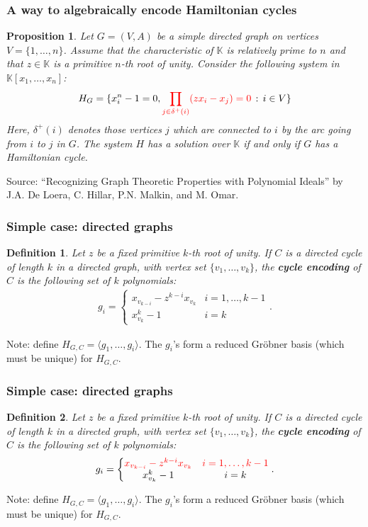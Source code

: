\documentclass{beamer}
\newtheorem*{prop}{Proposition}
\newtheorem*{defin}{Definition}
\begin{document}
\begin{frame}
\frametitle{A way to algebraically encode Hamiltonian cycles}
\begin{prop}
  Let $G = (V,A)$ be a simple directed graph on vertices $V = \{1, \ldots, n\}$. Assume that the characteristic of $\mathbb{K}$ is relatively prime to $n$ and that $z \in \mathbb{K}$ is a primitive $n$-th root of unity. Consider the following system in $\mathbb{K}[x_1, \ldots, x_n]$:
  \begin{align*}
    H_G = \{x_i^n - 1 = 0, {\color{red} \prod_{j \in \delta^+(i)} (z x_i - x_j) = 0} \, : \, i \in V\}
  \end{align*}
  Here, $\delta^+(i)$ denotes those vertices $j$ which are connected to $i$ by the arc going from $i$ to $j$ in $G$. The system $H$ has a solution over $\mathbb{K}$ if and only if $G$ has a Hamiltonian cycle.
\end{prop}
Source: ``Recognizing Graph Theoretic Properties with Polynomial Ideals'' by J.A. De Loera, C. Hillar, P.N. Malkin, and M. Omar.
\end{frame}

\begin{frame}
\frametitle{Simple case: directed graphs}
\begin{defin}
  Let $z$ be a fixed primitive $k$-th root of unity. If $C$ is a directed cycle of length $k$ in a directed graph, with vertex set $\{v_1, \ldots, v_k\}$, the \textbf{cycle encoding} of $C$ is the following set of $k$ polynomials:
  \begin{align*}
    g_i = \left \{ \begin{matrix} x_{v_{k-i}} - z^{k-i} x_{v_k} & i = 1, \ldots, k-1\\ x_{v_k}^k - 1 & i = k \end{matrix} \right ..
  \end{align*}
\end{defin}
Note: define $H_{G,C} = \langle g_1,\ldots, g_i \rangle$. The $g_i$'s form a reduced Gr\"obner basis (which must be unique) for $H_{G,C}$.
\end{frame}

\begin{frame}
\frametitle{Simple case: directed graphs}
\begin{defin}
  Let $z$ be a fixed primitive $k$-th root of unity. If $C$ is a directed cycle of length $k$ in a directed graph, with vertex set $\{v_1, \ldots, v_k\}$, the \textbf{cycle encoding} of $C$ is the following set of $k$ polynomials:
  \begin{align*}
    g_i = \left \{ \begin{matrix} {\color{red} x_{v_{k-i}} - z^{k-i} x_{v_k}} & {\color{red} i = 1, \ldots, k-1}\\ x_{v_k}^k - 1 & i = k \end{matrix} \right ..
  \end{align*}
\end{defin}
Note: define $H_{G,C} = \langle g_1,\ldots, g_i \rangle$. The $g_i$'s form a reduced Gr\"obner basis (which must be unique) for $H_{G,C}$.
\end{frame}
\end{document}
